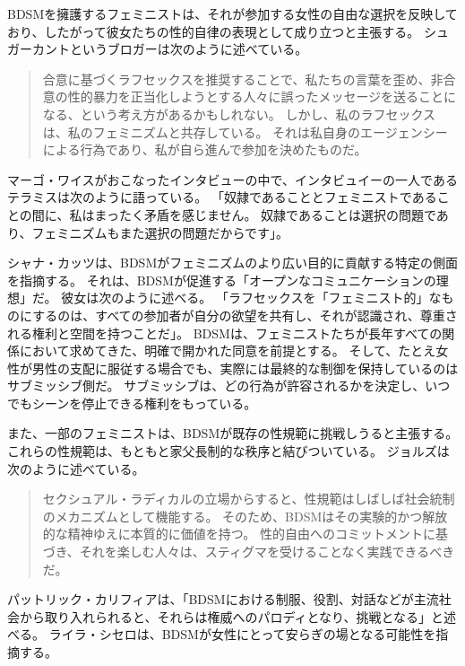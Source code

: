 \documentclass[paper=a4,book,openany]{jlreq}
\newcommand{\ig}[1]{}           %
\begin{document}
BDSMを擁護するフェミニストは、それが参加する女性の自由な選択を反映しており、したがって彼女たちの性的自律の表現として成り立つと主張する。
シュガーカントというブロガーは次のように述べている。

\begin{quote}
合意に基づくラフセックスを推奨することで、私たちの言葉を歪め、非合意の性的暴力を正当化しようとする人々に誤ったメッセージを送ることになる、という考え方があるかもしれない。
しかし、私のラフセックスは、私のフェミニズムと共存している。
それは私自身のエージェンシーによる行為であり、私が自ら進んで参加を決めたものだ。
\citep{tallon-hicks16:_can_you_be_femin_like_rough_sex}

\end{quote}

マーゴ・ワイス\ig{Margo Weiss}がおこなったインタビューの中で、インタビュイーの一人であるテラミスは次のように語っている。
「奴隷であることとフェミニストであることの間に、私はまったく矛盾を感じません。
奴隷であることは選択の問題であり、フェミニズムもまた選択の問題だからです」\citep{weiss11:_techn_pleas}。

シャナ・カッツは、BDSMがフェミニズムのより広い目的に貢献する特定の側面を指摘する。
それは、BDSMが促進する「オープンなコミュニケーションの理想」だ。
彼女は次のように述べる。
「ラフセックスを「フェミニスト的」なものにするのは、すべての参加者が自分の欲望を共有し、それが認識され、尊重される権利と空間を持つことだ」\citep{tallon-hicks16:_can_you_be_femin_like_rough_sex}。
BDSMは、フェミニストたちが長年すべての関係において求めてきた、明確で開かれた同意を前提とする。
そして、たとえ女性が男性の支配に服従する場合でも、実際には最終的な制御を保持しているのはサブミッシブ側だ。
サブミッシブは、どの行為が許容されるかを決定し、いつでもシーンを停止できる権利をもっている。

また、一部のフェミニストは、BDSMが既存の性規範に挑戦しうると主張する。
これらの性規範は、もともと家父長制的な秩序と結びついている。
ジョルズは次のように述べている。

\begin{quote}
  セクシュアル・ラディカルの立場からすると、性規範はしばしば社会統制のメカニズムとして機能する。
そのため、BDSMはその実験的かつ解放的な精神ゆえに本質的に価値を持つ。
性的自由へのコミットメントに基づき、それを楽しむ人々は、スティグマを受けることなく実践できるべきだ。
\citep[p.268]{jolles15:_pleas_pain_femin_polit_rough_sex}

\end{quote}

パットリック・カリフィアは、「BDSMにおける制服、役割、対話などが主流社会から取り入れられると、それらは権威へのパロディとなり、挑戦となる」と述べる\citep{califia79:_unrav_sexual_fring}。
ライラ・シセロは、BDSMが女性にとって安らぎの場となる可能性を指摘する。
\end{document}
